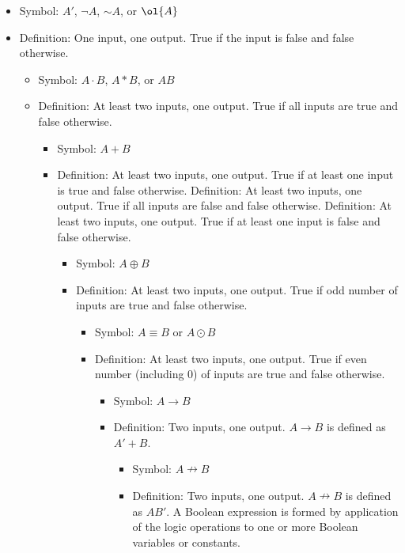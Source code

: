 \documentclass[a4paper,12pt]{article}
\begin{document}
\begin{itemize}
\item Symbol: $A'$, $\neg A$, $\mathord{\sim}A$, or $\ol{A}$
\item Definition: One input, one output. True if the input is false and false otherwise.
\eit 
{}
\begin{itemize}
\item Symbol: $A \cdot B$, $A*B$, or $AB$
\item Definition: At least two inputs, one output. True if all inputs are true and false otherwise.
\eit
{}
\begin{itemize}
\item Symbol: $A + B$
\item Definition: At least two inputs, one output. True if at least one input is true and false otherwise.
\eit
{}
Definition: At least two inputs, one output. True if all inputs are false and false otherwise.
Definition: At least two inputs, one output. True if at least one input is false and false otherwise.
\begin{itemize}
\item Symbol: $A \oplus B$
\item Definition: At least two inputs, one output. True if odd number of inputs are true and false otherwise.
\eit
{}
\begin{itemize}
\item Symbol: $A\equiv B$ or $A\odot B$
\item Definition: At least two inputs, one output. True if even number (including 0) of inputs are true and false otherwise.
\eit
{}
\begin{itemize}
\item Symbol: $A \rightarrow B$
\item Definition: Two inputs, one output. $A\rightarrow B$ is defined as $A'+B$.
\eit
{}
\begin{itemize}
\item Symbol: $A\nrightarrow B$
\item Definition: Two inputs, one output. $A\nrightarrow B$ is defined as $AB'$.
\eit
{}
A Boolean expression is formed by application of the logic operations to one or more Boolean variables or constants. 


\end{itemize}
\end{itemize}
\end{itemize}
\end{itemize}
\end{itemize}
\end{itemize}
\end{itemize}
\end{document}
